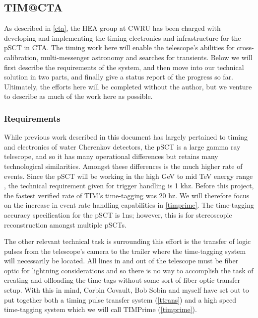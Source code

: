 \subsection{TIM@CTA}
\label{timatcta}%
As described in \autoref{cta}, the HEA group at CWRU has been charged with developing and implementing the timing electronics and infrastructure for the pSCT in CTA. The timing work here will enable the telescope's abilities for cross-calibration, multi-messenger astronomy and searches for transients. Below we will first describe the requirements of the system, and then move into our technical solution in two parts, and finally give a status report of the progress so far. Ultimately, the efforts here will be completed without the author, but we venture to describe as much of the work here as possible.
\subsubsection{Requirements}
While previous work described in this document has largely pertained to timing and electronics of water Cherenkov detectors, the pSCT is a large gamma ray telescope, and so it has many operational differences but retains many technological similarities. Amongst these differences is the much higher rate of events. Since the pSCT will be working in the high GeV to mid TeV energy range \cite{ctaong},  the technical requirement given for trigger handling is 1 khz. Before this project, the fastest verified rate of TIM's time-tagging was 20 hz. We will therefore focus on the increase in event rate handling capabilities in \autoref{timprime}. The time-tagging accuracy specification for the pSCT is 1ns; however, this is for stereoscopic reconstruction amongst multiple pSCTs.

The other relevant technical task is surrounding this effort is the transfer of logic pulses from the telescope's camera to the trailer where the time-tagging system will necessarily be located. All lines in and out of the telescope must be fiber optic for lightning considerations and so there is no way to accomplish the task of creating and offloading the time-tags without some sort of fiber optic transfer setup. With this in mind, Corbin Covault, Bob Sobin and myself have set out to put together both a timing pulse transfer system (\autoref{ttrans}) and a high speed time-tagging system which we will call TIMPrime (\autoref{timprime}).

